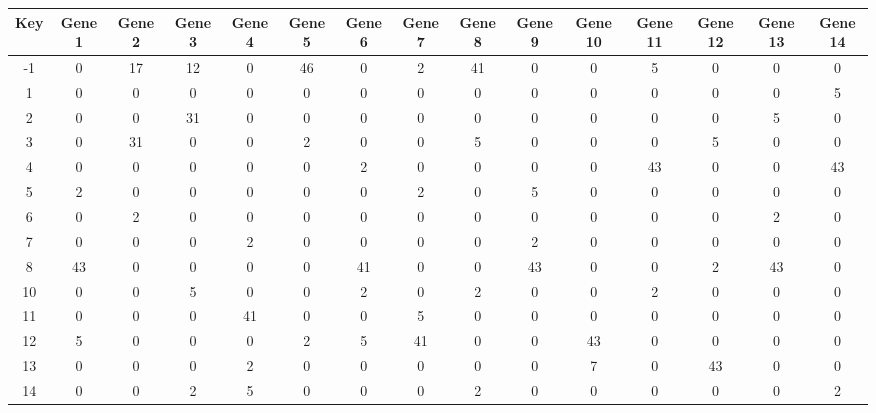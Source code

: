 \begin{tabular}{|c|c|c|c|c|c|c|c|c|c|c|c|c|c|c|}
\hline
Key & Gene 1 & Gene 2 & Gene 3 & Gene 4 & Gene 5 & Gene 6 & Gene 7 & Gene 8 & Gene 9 & Gene 10 & Gene 11 & Gene 12 & Gene 13 & Gene 14 \\
\hline
-1 & 0 & 17 & 12 & 0 & 46 & 0 & 2 & 41 & 0 & 0 & 5 & 0 & 0 & 0 \\
1 & 0 & 0 & 0 & 0 & 0 & 0 & 0 & 0 & 0 & 0 & 0 & 0 & 0 & 5 \\
2 & 0 & 0 & 31 & 0 & 0 & 0 & 0 & 0 & 0 & 0 & 0 & 0 & 5 & 0 \\
3 & 0 & 31 & 0 & 0 & 2 & 0 & 0 & 5 & 0 & 0 & 0 & 5 & 0 & 0 \\
4 & 0 & 0 & 0 & 0 & 0 & 2 & 0 & 0 & 0 & 0 & 43 & 0 & 0 & 43 \\
5 & 2 & 0 & 0 & 0 & 0 & 0 & 2 & 0 & 5 & 0 & 0 & 0 & 0 & 0 \\
6 & 0 & 2 & 0 & 0 & 0 & 0 & 0 & 0 & 0 & 0 & 0 & 0 & 2 & 0 \\
7 & 0 & 0 & 0 & 2 & 0 & 0 & 0 & 0 & 2 & 0 & 0 & 0 & 0 & 0 \\
8 & 43 & 0 & 0 & 0 & 0 & 41 & 0 & 0 & 43 & 0 & 0 & 2 & 43 & 0 \\
10 & 0 & 0 & 5 & 0 & 0 & 2 & 0 & 2 & 0 & 0 & 2 & 0 & 0 & 0 \\
11 & 0 & 0 & 0 & 41 & 0 & 0 & 5 & 0 & 0 & 0 & 0 & 0 & 0 & 0 \\
12 & 5 & 0 & 0 & 0 & 2 & 5 & 41 & 0 & 0 & 43 & 0 & 0 & 0 & 0 \\
13 & 0 & 0 & 0 & 2 & 0 & 0 & 0 & 0 & 0 & 7 & 0 & 43 & 0 & 0 \\
14 & 0 & 0 & 2 & 5 & 0 & 0 & 0 & 2 & 0 & 0 & 0 & 0 & 0 & 2 \\
\hline
\end{tabular}